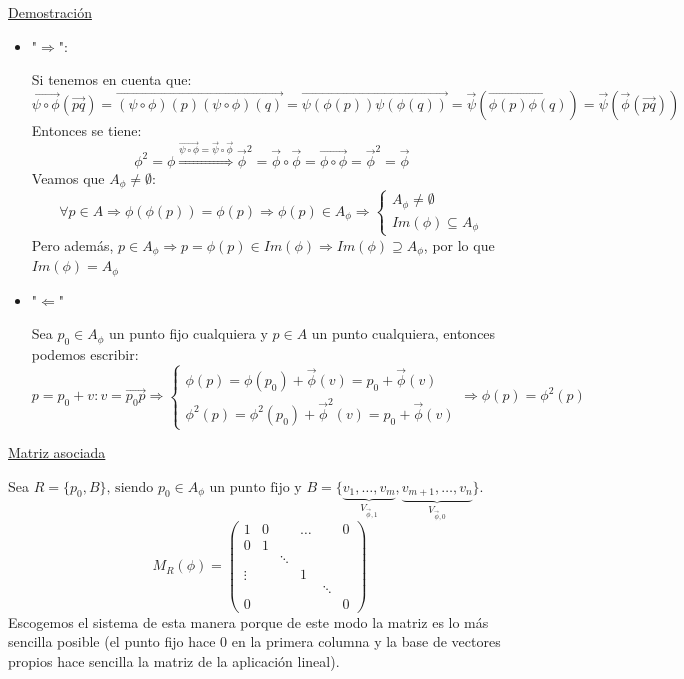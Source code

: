 \documentclass[10pt,a4paper,openright]{book}
\theoremstyle{break}
\begin{document}
\underline{Demostración}
\begin{itemize}
\item "$\Rightarrow$":

Si tenemos en cuenta que:
$$\overrightarrow{\psi \circ \phi}(\vec{pq}) = \overrightarrow{(\psi \circ \phi)(p) (\psi \circ \phi)(q)} = \overrightarrow{\psi (\phi (p)) \psi (\phi (q))} = \vec{\psi}(\overrightarrow{\phi(p) \phi(q)}) = \vec{\psi} (\vec{\phi} (\vec{pq}))$$
Entonces se tiene:
$$\phi^2 = \phi \overset{\overrightarrow{\psi \circ \phi} = \vec{\psi} \circ \vec{\phi}}{\Longrightarrow} \vec{\phi}^2 = \vec{\phi} \circ \vec{\phi} = \overrightarrow{\phi \circ \phi} = \vec{\phi}^2 = \vec{\phi}$$
Veamos que $A_\phi \neq \emptyset$:
$$\forall p \in A \Rightarrow \phi(\phi(p)) = \phi (p) \Rightarrow \phi(p) \in A_\phi \Rightarrow \begin{cases} A_\phi \neq \emptyset \\ Im(\phi) \subseteq A_\phi \end{cases}$$
Pero además, $p \in A_\phi \Rightarrow p = \phi(p) \in Im(\phi) \Rightarrow Im(\phi) \supseteq A_\phi $, por lo que $Im (\phi) = A_\phi$

\item "$\Leftarrow$"

Sea $p_0 \in A_\phi$ un punto fijo cualquiera y $p \in A$ un punto cualquiera, entonces podemos escribir:
$$p = p_0 + v : v = \vec{p_0p} \Rightarrow \begin{cases} \phi(p) = \phi(p_0) + \vec{\phi}(v) = p_0 + \vec{\phi}(v) \\ \phi^2(p) = \phi^2(p_0) + \vec{\phi}^2(v) = p_0 + \vec{\phi}(v) \end{cases} \Rightarrow \phi(p) = \phi^2 (p)$$
\end{itemize}

\underline{Matriz asociada}

Sea $R = \{p_0, B\} \mbox{, siendo } p_0 \in A_\phi \mbox{ un punto fijo y } B = \{\underbrace{v_1, \ldots, v_m}_{V_{\vec{\phi}, 1}}, \underbrace{v_{m+1}, \ldots, v_n}_{V_{\vec{\phi}, 0}} \}$.
$$M_{R} (\phi) = \left(\begin{array}{c|ccccc}
1  & 0 & & \ldots & & 0 \\
\hline
0  & 1 & & & & \\
& & \ddots & & & \\
\vdots &  & & 1 & & \\
&  & &  & \ddots & \\
0 & & & & & 0
\end{array}
\right)$$
Escogemos el sistema de esta manera porque de este modo la matriz es lo más sencilla posible (el punto fijo hace 0 en la primera columna y la base de vectores propios hace sencilla la matriz de la aplicación lineal).
\end{document}
